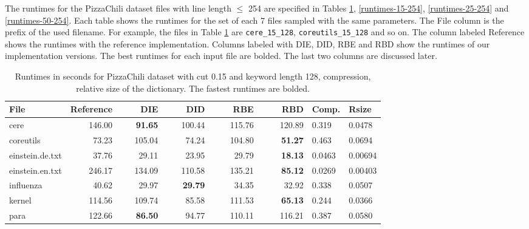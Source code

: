 \documentclass[english,twoside,censored,csm,algorithms-track-2020]{HYthesisML}
\theoremstyle{plain}
\theoremstyle{definition}
\begin{document}
The runtimes for the PizzaChili dataset files with line length $\leq$ 254 are specified in
Tables \ref{runtimes-15-128},
\ref{runtimes-15-254}, \ref{runtimes-25-254} and \ref{runtimes-50-254}. Each table shows the
runtimes for the set of each 7 files sampled with the same parameters. The File column is the
prefix of the used filename. For example, the files in Table \ref{runtimes-15-128} are
\texttt{cere\_15\_128}, \texttt{coreutils\_15\_128} and so on. The column labeled Reference shows
the runtimes with the reference implementation. Columns labeled with DIE, DID, RBE and RBD show the
runtimes of our implementation versions. The best runtimes for each input file are bolded.
The last two columns are discussed later.

\begin{center}
  \begin{table}
  \begin{tabular} {| l |r r r r r|l l|}
    \hline
    \textbf{File} & \textbf{Reference} & ~~~~\textbf{DIE} & ~~~~\textbf{DID} & ~~~~\textbf{RBE} & ~~~~\textbf{RBD} & \textbf{Comp.} & \textbf{Rsize} \\
    \hline
    cere & 146.00 & \textbf{91.65} & 100.44 & 115.76 & 120.89            & 0.319  & 0.0478  \\
    coreutils & 73.23 & 105.04 & 74.24 & 104.80 & \textbf{51.27}         & 0.463  & 0.0694  \\
    einstein.de.txt & 37.76 & 29.11 & 23.95 & 29.79 & \textbf{18.13}     & 0.0463 & 0.00694 \\
    einstein.en.txt & 246.17 & 134.09 & 110.58 & 135.21 & \textbf{85.12} & 0.0269 & 0.00403 \\
    influenza & 40.62 & 29.97 & \textbf{29.79} & 34.35 & 32.92           & 0.338  & 0.0507  \\
    kernel & 114.56 & 109.74 & 85.58 & 111.53 & \textbf{65.13}           & 0.244  & 0.0366  \\
    para & 122.66 & \textbf{86.50} & 94.77 & 110.11 & 116.21             & 0.387  & 0.0580  \\
    \hline
  \end{tabular}
  \caption{Runtimes in seconds for PizzaChili dataset with cut 0.15 and keyword length 128, compression, relative size of the dictionary. The fastest runtimes are bolded.}
  \label{runtimes-15-128}
  \end{table}
\end{center}
\end{document}
